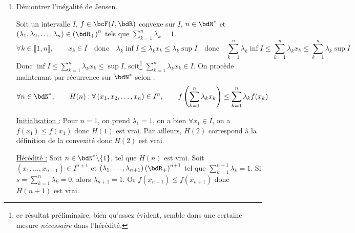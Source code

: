 \documentclass[a4paper,french,bookmarks]{article}
\begin{document}
\begin{enumerate}
    \item Démontrer l'inégalité de Jensen.
    
    \noafter
    \nobefore\yesafter
    \begin{nproof}
        Soit un intervalle $I$, $f \in \bcF(I, \bdR)$ convexe sur $I$,
        $n \in \bdN^*$ et $\left(\lambda_1, \lambda_2, \dots,
        \lambda_n\right) \in \left(\bdR_+\right)^n$ tels que
        $\displaystyle \sum_{k=1}^n \lambda_k = 1$.
        \[\forall k \in \llbracket 1, n\rrbracket,\qquad x_k \in I \quad
        \text{donc} \quad \lambda_k\inf I \leq \lambda_kx_k \leq
        \lambda_k \sup I \quad \text{donc} \quad \sum_{k=1}^n \lambda_k
        \inf I \leq \sum_{k=1}^n \lambda_kx_k \leq \sum_{k=1}^n
        \lambda_k \sup I\]
        Donc $\displaystyle \inf I \leq \sum_{k=1}^n \lambda_kx_k \leq
        \sup I$, soit\footnote{ce résultat préliminaire, bien qu'assez
        évident, semble dans une certaine mesure \textit{nécessaire}
        dans l'hérédité.} $\displaystyle \sum_{k=1}^n \lambda_kx_k \in
        I$. On procède maintenant par récurrence sur $\bdN^*$ selon :
        \[ \forall n \in \bdN^*,\qquad H(n) : \forall \left(x_1, x_2,
        \dots, x_n\right) \in I^n,\qquad f\left(\sum_{k=1}^n
        \lambda_kx_k\right) \leq \sum_{k=1}^n \lambda_kf(x_k)\]
        \begin{enumerate}
            \itt \underline{Initialisation :} Pour $n=1$, on prend
            $\lambda_1 = 1$, on a bien $\forall x_1 \in I$, on a $f(x_1)
            \leq f(x_1)$ donc $H(1)$ est vrai. Par ailleurs, $H(2)$
            correspond à la définition de la convexité donc $H(2)$ est
            vrai.
            
            \itt \underline{Hérédité :} Soit $n \in \bdN^* \backslash \{
            1 \}$, tel que $H(n)$ est vrai. Soit $\left(x_1, \dots,
            x_{n+1}\right) \in I^{n+1}$ et $\left(\lambda_1, \dots,
            \lambda_{n+1}\right) \left(\bdR_+\right)^{n+1}$ tel que
            $\displaystyle\sum_{k=1}^{n+1} \lambda_k = 1$. Si $s =
            \displaystyle\sum_{k=1}^n \lambda_k = 0$, alors
            $\lambda_{n+1} = 1$. Or  $f(x_{n+1}) \leq f(x_{n+1})$ donc
            $H(n+1)$ est vrai.
            

\end{enumerate}
\end{nproof}
\end{enumerate}
\end{document}
